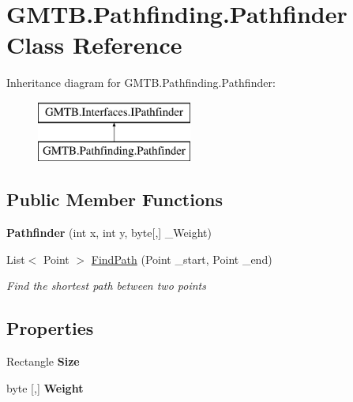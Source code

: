 \hypertarget{class_g_m_t_b_1_1_pathfinding_1_1_pathfinder}{}\section{G\+M\+T\+B.\+Pathfinding.\+Pathfinder Class Reference}
\label{class_g_m_t_b_1_1_pathfinding_1_1_pathfinder}
Inheritance diagram for G\+M\+T\+B.\+Pathfinding.\+Pathfinder\+:\begin{figure}[H]
\begin{center}
\leavevmode
\includegraphics[height=2.000000cm]{class_g_m_t_b_1_1_pathfinding_1_1_pathfinder}
\end{center}
\end{figure}
\subsection*{Public Member Functions}
\begin{DoxyCompactItemize}
\item 
\mbox{\label{class_g_m_t_b_1_1_pathfinding_1_1_pathfinder_ae0afe726defbedd2c379740d9fe5323d}} 
{\bfseries Pathfinder} (int x, int y, byte\mbox{[},\mbox{]} \+\_\+\+Weight)
\item 
List$<$ Point $>$ \mbox{\hyperlink{class_g_m_t_b_1_1_pathfinding_1_1_pathfinder_af65d294d194ccaeb70f31dd4b652393c}{Find\+Path}} (Point \+\_\+start, Point \+\_\+end)
\begin{DoxyCompactList}\small\item\em Find the shortest path between two points \end{DoxyCompactList}\end{DoxyCompactItemize}
\subsection*{Properties}
\begin{DoxyCompactItemize}
\item 
\mbox{\label{class_g_m_t_b_1_1_pathfinding_1_1_pathfinder_ad7a1e2747142667defecae282f222945}} 
Rectangle {\bfseries Size}
\item 
\mbox{\label{class_g_m_t_b_1_1_pathfinding_1_1_pathfinder_ae94fcfb20250396f5515cf7725fc878c}} 
byte \mbox{[},\mbox{]} {\bfseries Weight}
\end{DoxyCompactItemize}


